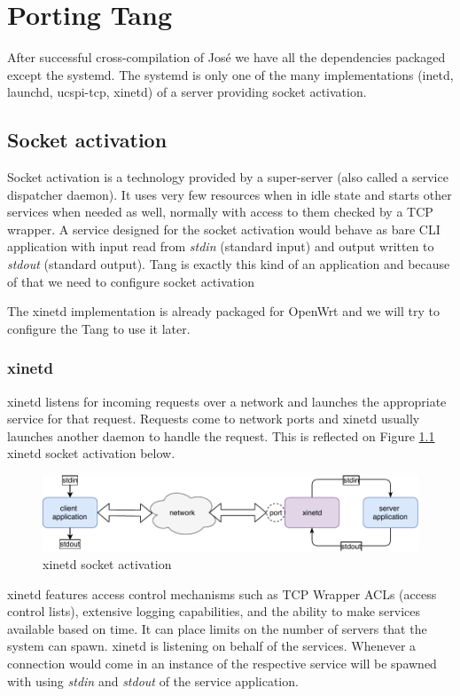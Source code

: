 \chapter{Porting Tang}\label{porting-tang}

After successful cross-compilation of José we have all the dependencies packaged except the systemd.
The systemd is only one of the many implementations (inetd, launchd, ucspi-tcp, xinetd) of a server providing socket activation.



\section{Socket activation}\label{socket_activation}

Socket activation is a technology provided by a super-server (also called a service dispatcher daemon).
It uses very few resources when in idle state and starts other services when needed as well, normally with access to them checked by a TCP wrapper.
A service designed for the socket activation would behave as bare CLI application with input read from {\it stdin} (standard input) and output written to {\it stdout} (standard output).
Tang is exactly this kind of an application and because of that we need to configure socket activation

The xinetd implementation is already packaged for OpenWrt and we will try to configure the Tang to use it later.



\subsection{xinetd}
xinetd listens for incoming requests over a network and launches the appropriate service for that request.
Requests come to network ports and xinetd usually launches another daemon to handle the request.
This is reflected on Figure \ref{fig_xinetd} xinetd socket activation below.
\begin{figure}[h]
    \centering
    \includegraphics[scale=0.9]{figures/xinetd.pdf}
    \caption{xinetd socket activation}
    \label{fig_xinetd}
\end{figure}
xinetd features access control mechanisms such as TCP Wrapper ACLs (access control lists), extensive logging capabilities, and the ability to make services available based on time.
It can place limits on the number of servers that the system can spawn.
xinetd is listening on behalf of the services.
Whenever a connection would come in an instance of the respective service will be spawned with using {\it stdin} and {\it stdout} of the service application\cite{xinetd}.


